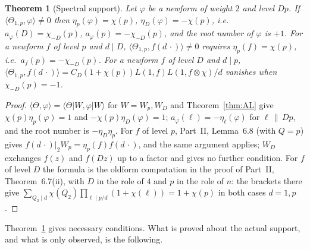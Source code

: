 \documentclass[11pt]{amsart}
\newtheorem{theorem}{Theorem}[section]
\theoremstyle{remark}
\begin{document}
\begin{theorem}[Spectral support]\label{thm:support}
Let $\varphi$ be a newform of weight $2$ and level $Dp$. If $\langle\Theta_{1,p},\varphi\rangle\ne0$ then $\eta_p(\varphi)=\chi(p)$, $\eta_D(\varphi)=-\chi(p)$, i.e.\ $a_\varphi(D)=\chi_{-D}(p)$, $a_\varphi(p)=-\chi_{-D}(p)$, and the root number of $\varphi$ is $+1$. For a newform $f$ of level $p$ and $d\mid D$, $\langle\Theta_{1,p},f(d\,\cdot)\rangle\ne0$ requires $\eta_p(f)=\chi(p)$, i.e.\ $a_f(p)=-\chi_{-D}(p)$. For a newform $f$ of level $D$ and $d\mid p$, $\langle\Theta_{1,p},f(d\,\cdot)\rangle=C_D(1+\chi(p))L(1,f)L(1,f\otimes\chi)/d$ vanishes when $\chi_{-D}(p)=-1$.
\end{theorem}
\begin{proof}
$\langle\Theta,\varphi\rangle=\langle\Theta|W,\varphi|W\rangle$ for $W=W_p,W_D$ and Theorem~\ref{thm:AL} give $\chi(p)\eta_p(\varphi)=1$ and $-\chi(p)\eta_D(\varphi)=1$; $a_\varphi(\ell)=-\eta_\ell(\varphi)$ for $\ell\,\|\,Dp$, and the root number is $-\eta_D\eta_p$. For $f$ of level $p$, Part~II, Lemma~6.8 (with $Q=p$) gives $f(d\,\cdot)|_2W_p=\eta_p(f)f(d\,\cdot)$, and the same argument applies; $W_D$ exchanges $f(z)$ and $f(Dz)$ up to a factor and gives no further condition. For $f$ of level $D$ the formula is the oldform computation in the proof of Part~II, Theorem~6.7(ii), with $D$ in the role of $4$ and $p$ in the role of $n$: the brackets there give $\sum_{Q_2\mid d}\chi(Q_2)\prod_{\ell\mid p/d}(1+\chi(\ell))=1+\chi(p)$ in both cases $d=1,p$.
\end{proof}

Theorem~\ref{thm:support} gives necessary conditions. What is proved about the actual support, and what is only observed, is the following.
\end{document}
